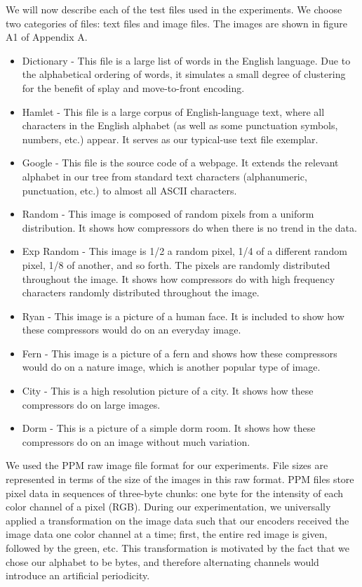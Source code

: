 \documentclass[twoside]{article}
\begin{document}
\begin{multicols}{2}
We will now describe each of the test files used in the experiments. We choose two categories of files: text files and image files. The images are shown in figure A1 of Appendix A.

\begin{itemize}
\item Dictionary - This file is a large list of words in the English language. Due to the alphabetical ordering of words, it simulates a small degree of clustering for the benefit of splay and move-to-front encoding. 
\item Hamlet - This file is a large corpus of English-language text, where all characters in the English alphabet (as well as some punctuation symbols, numbers, etc.) appear. It serves as our typical-use text file exemplar.
\item Google - This file is the source code of a webpage. It extends the relevant alphabet in our tree from standard text characters (alphanumeric, punctuation, etc.) to almost all ASCII characters.
\item Random - This image is composed of random pixels from a uniform distribution. It shows how compressors do when there is no trend in the data.
\item Exp Random - This image is 1/2 a random pixel, 1/4 of a different random pixel, 1/8 of another, and so forth. The pixels are randomly distributed throughout the image. It shows how compressors do with high frequency characters randomly distributed throughout the image. 
\item Ryan - This image is a picture of a human face. It is included to show how these compressors would do on an everyday image.
\item Fern - This image is a picture of a fern and shows how these compressors would do on a nature image, which is another popular type of image.
\item City - This is a high resolution picture of a city. It shows how these compressors do on large images. 
\item Dorm - This is a picture of a simple dorm room. It shows how these compressors do on an image without much variation.
\end{itemize}

We used the PPM raw image file format for our experiments. File sizes are represented in terms of the size of the images in this raw format. PPM files store pixel data in sequences of three-byte chunks: one byte for the intensity of each color channel of a pixel (RGB). During our experimentation, we universally applied a transformation on the image data such that our encoders received the image data one color channel at a time; first, the entire red image is given, followed by the green, etc. This transformation is motivated by the fact that we chose our alphabet to be bytes, and therefore alternating channels would introduce an artificial periodicity.


\end{multicols}
\end{document}
